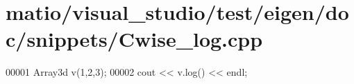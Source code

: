 \hypertarget{matio_2visual__studio_2test_2eigen_2doc_2snippets_2_cwise__log_8cpp_source}{}\section{matio/visual\+\_\+studio/test/eigen/doc/snippets/\+Cwise\+\_\+log.cpp}
\label{matio_2visual__studio_2test_2eigen_2doc_2snippets_2_cwise__log_8cpp_source}

\begin{DoxyCode}
00001 Array3d v(1,2,3);
00002 cout << v.log() << endl;
\end{DoxyCode}
